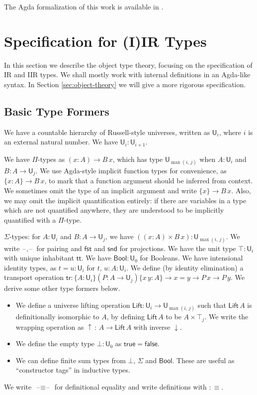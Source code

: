 \documentclass[acmsmall,screen,review,anonymous]{acmart}
\newcommand{\msf}[1]{{\mathsf{#1}}}
\newcommand{\U}{\msf{U}}
\newcommand{\Lift}{\msf{Lift}}
\newcommand{\lup}{\uparrow}
\newcommand{\ldown}{\downarrow}
\newcommand{\ttt}{\msf{tt}}
\newcommand{\blank}{{\mathord{\hspace{1pt}\text{--}\hspace{1pt}}}}
\newcommand{\tr}{\msf{tr}}
\newcommand{\fst}{\msf{fst}}
\newcommand{\snd}{\msf{snd}}
\newcommand{\Bool}{\msf{Bool}}
\newcommand{\true}{\msf{true}}
\newcommand{\false}{\msf{false}}
\begin{document}
The Agda formalization of this work is available in \cite{TODO}.

\section{Specification for (I)IR Types}\label{sec:specification}

In this section we describe the object type theory, focusing on the specification of IR and IIR
types. We shall mostly work with internal definitions in an Agda-like syntax. In Section
\ref{sec:object-theory} we will give a more rigorous specification.

\subsection{Basic Type Formers}\label{sec:basic-type-formers}
We have a countable hierarchy of Russell-style universes, written as $\U_i$, where $i$ is an
external natural number. We have $\U_i : \U_{i + 1}$.

We have $\Pi$-types as $(x : A) \to B\,x$, which has type $\U_{\max(i,\,j)}$ when $A : \U_i$ and $B
: A \to \U_j$. We use Agda-style implicit function types for convenience, as $\{x : A\} \to B\,x$,
to mark that a function argument should be inferred from context. We sometimes omit the type of an
implicit argument and write $\{x\} \to B\,x$.  Also, we may omit the implicit quantification
entirely: if there are variables in a type which are not quantified anywhere, they are understood
to be implicitly quantified with a $\Pi$-type.

$\Sigma$-types: for $A : \U_i$ and $B : A \to \U_j$, we have $((x : A) \times B\,x) :
\U_{\max(i,\,j)}$.  We write $\blank,\blank$ for pairing and $\fst$ and $\snd$ for projections. We
have the unit type $\top : \U_i$ with unique inhabitant $\ttt$. We have $\Bool : \U_0$ for
Booleans. We have intensional identity types, as $t = u : \U_i$ for $t,\,u : A : \U_i$. We define (by
identity elimination) a transport operation $\tr : \{A : \U_i\}(P : A \to \U_j)\{x\,y : A\} \to x =
y \to P\,x \to P\,y$. We derive some other type formers below.
\begin{itemize}
  \item We define a universe lifting operation $\Lift : \U_i \to \U_{\max(i,\,j)}$ such that
    $\Lift\,A$ is definitionally isomorphic to $A$, by defining $\Lift\,A$ to be $A \times \top_j$. We
    write the wrapping operation as $\lup\,:\,A \to \Lift\,A$ with inverse $\ldown$.
  \item We define the empty type $\bot : \U_0$ as $\true = \false$.
  \item We can define finite sum types from $\bot$, $\Sigma$ and $\Bool$. These are useful
    as ``constructor tags'' in inductive types.
\end{itemize}
We write $\blank\!\!\equiv\!\!\blank$ for definitional equality and write definitions with $:\equiv$.
\end{document}
